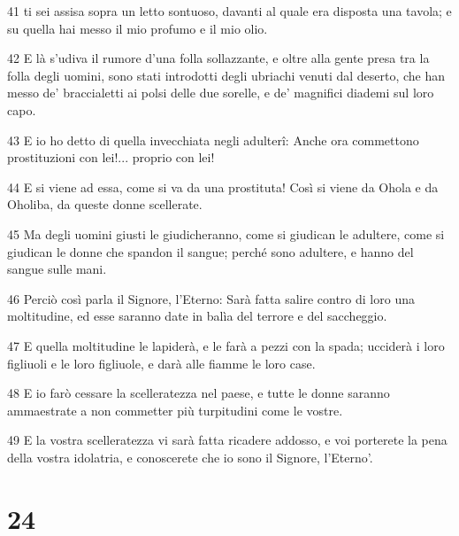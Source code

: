 \par 41 ti sei assisa sopra un letto sontuoso, davanti al quale era disposta una tavola; e su quella hai messo il mio profumo e il mio olio.
\par 42 E là s'udiva il rumore d'una folla sollazzante, e oltre alla gente presa tra la folla degli uomini, sono stati introdotti degli ubriachi venuti dal deserto, che han messo de' braccialetti ai polsi delle due sorelle, e de' magnifici diademi sul loro capo.
\par 43 E io ho detto di quella invecchiata negli adulterî: Anche ora commettono prostituzioni con lei!... proprio con lei!
\par 44 E si viene ad essa, come si va da una prostituta! Così si viene da Ohola e da Oholiba, da queste donne scellerate.
\par 45 Ma degli uomini giusti le giudicheranno, come si giudican le adultere, come si giudican le donne che spandon il sangue; perché sono adultere, e hanno del sangue sulle mani.
\par 46 Perciò così parla il Signore, l'Eterno: Sarà fatta salire contro di loro una moltitudine, ed esse saranno date in balìa del terrore e del saccheggio.
\par 47 E quella moltitudine le lapiderà, e le farà a pezzi con la spada; ucciderà i loro figliuoli e le loro figliuole, e darà alle fiamme le loro case.
\par 48 E io farò cessare la scelleratezza nel paese, e tutte le donne saranno ammaestrate a non commetter più turpitudini come le vostre.
\par 49 E la vostra scelleratezza vi sarà fatta ricadere addosso, e voi porterete la pena della vostra idolatria, e conoscerete che io sono il Signore, l'Eterno'.

\chapter{24}

